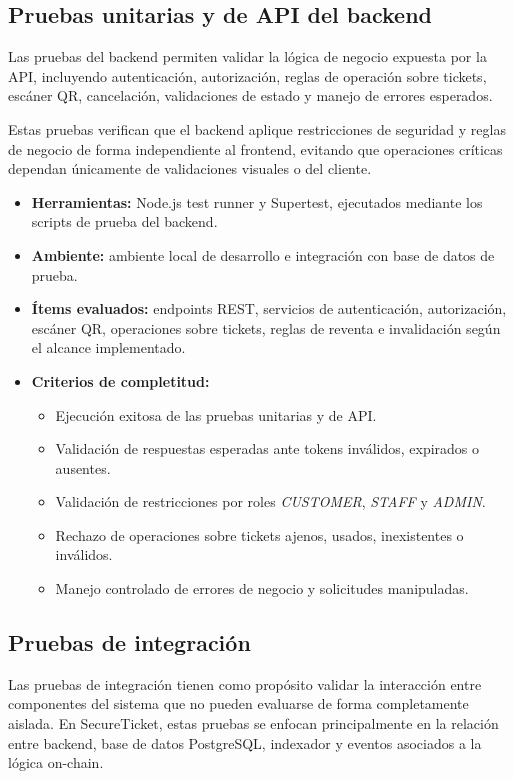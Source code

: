 \documentclass[12pt,letterpaper]{article}
\newcommand{\NombreProyecto}{SecureTicket}
\begin{document}
\subsection{Pruebas unitarias y de API del backend}

Las pruebas del backend permiten validar la lógica de negocio expuesta por la API, incluyendo autenticación, autorización, reglas de operación sobre tickets, escáner QR, cancelación, validaciones de estado y manejo de errores esperados.

Estas pruebas verifican que el backend aplique restricciones de seguridad y reglas de negocio de forma independiente al frontend, evitando que operaciones críticas dependan únicamente de validaciones visuales o del cliente.

\begin{itemize}
    \item \textbf{Herramientas:} Node.js test runner y Supertest, ejecutados mediante los scripts de prueba del backend.
    \item \textbf{Ambiente:} ambiente local de desarrollo e integración con base de datos de prueba.
    \item \textbf{Ítems evaluados:} endpoints REST, servicios de autenticación, autorización, escáner QR, operaciones sobre tickets, reglas de reventa e invalidación según el alcance implementado.
    \item \textbf{Criterios de completitud:}
    \begin{itemize}
        \item Ejecución exitosa de las pruebas unitarias y de API.
        \item Validación de respuestas esperadas ante tokens inválidos, expirados o ausentes.
        \item Validación de restricciones por roles \textit{CUSTOMER}, \textit{STAFF} y \textit{ADMIN}.
        \item Rechazo de operaciones sobre tickets ajenos, usados, inexistentes o inválidos.
        \item Manejo controlado de errores de negocio y solicitudes manipuladas.
    \end{itemize}
\end{itemize}

\subsection{Pruebas de integración}

Las pruebas de integración tienen como propósito validar la interacción entre componentes del sistema que no pueden evaluarse de forma completamente aislada. En \NombreProyecto{}, estas pruebas se enfocan principalmente en la relación entre backend, base de datos PostgreSQL, indexador y eventos asociados a la lógica on-chain.
\end{document}
